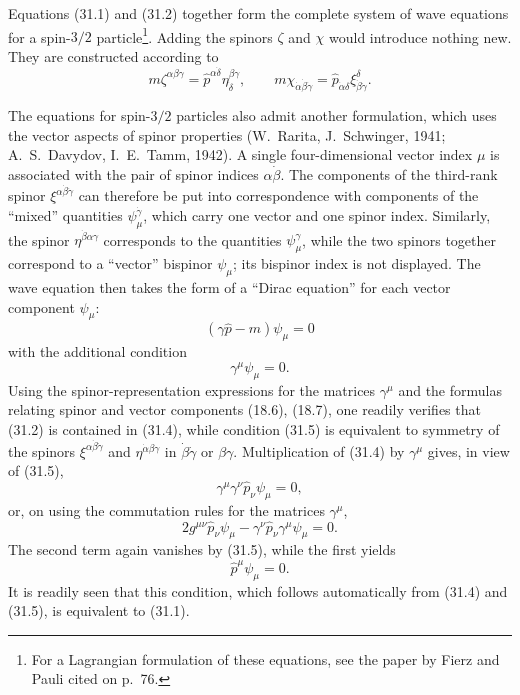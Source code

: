 Equations (31.1) and (31.2) together form the complete system of wave equations for a spin-$3/2$ particle\footnote{For a Lagrangian formulation of these equations, see the paper by Fierz and Pauli cited on p.~76.}. Adding the spinors $\zeta$ and $\chi$ would introduce nothing new. They are constructed according to
\[
m\zeta^{\alpha\beta\gamma}
=\widehat p^{\alpha\dot\delta}\eta^{\beta\gamma}_{\dot\delta},
\qquad
m\chi_{\dot\alpha\dot\beta\dot\gamma}
=\widehat p_{\dot\alpha\delta}\xi^\delta_{\dot\beta\dot\gamma}.
\]

The equations for spin-$3/2$ particles also admit another formulation, which uses the vector aspects of spinor properties (W.~Rarita, J.~Schwinger, 1941; A.~S.~Davydov, I.~E.~Tamm, 1942). A single four-dimensional vector index $\mu$ is associated with the pair of spinor indices $\alpha\dot\beta$. The components of the third-rank spinor $\xi^{\alpha\dot\beta\dot\gamma}$ can therefore be put into correspondence with components of the ``mixed'' quantities $\psi_\mu^{\dot\gamma}$, which carry one vector and one spinor index. Similarly, the spinor $\eta^{\dot\beta\alpha\gamma}$ corresponds to the quantities $\psi_\mu^\gamma$, while the two spinors together correspond to a ``vector'' bispinor $\psi_\mu$; its bispinor index is not displayed. The wave equation then takes the form of a ``Dirac equation'' for each vector component $\psi_\mu$:
\begin{equation}
(\gamma\widehat p-m)\psi_\mu=0
\tag{31.4}
\end{equation}
with the additional condition
\begin{equation}
\gamma^\mu\psi_\mu=0.
\tag{31.5}
\end{equation}
Using the spinor-representation expressions for the matrices $\gamma^\mu$ and the formulas relating spinor and vector components (18.6), (18.7), one readily verifies that (31.2) is contained in (31.4), while condition (31.5) is equivalent to symmetry of the spinors $\xi^{\alpha\dot\beta\dot\gamma}$ and $\eta^{\dot\alpha\beta\gamma}$ in $\dot\beta\dot\gamma$ or $\beta\gamma$. Multiplication of (31.4) by $\gamma^\mu$ gives, in view of (31.5),
\[
\gamma^\mu\gamma^\nu\widehat p_\nu\psi_\mu=0,
\]
or, on using the commutation rules for the matrices $\gamma^\mu$,
\begin{equation}
2g^{\mu\nu}\widehat p_\nu\psi_\mu
-\gamma^\nu\widehat p_\nu\gamma^\mu\psi_\mu=0.
\tag{31.6}
\end{equation}
The second term again vanishes by (31.5), while the first yields
\begin{equation}
\widehat p^\mu\psi_\mu=0.
\tag{31.7}
\end{equation}
It is readily seen that this condition, which follows automatically from (31.4) and (31.5), is equivalent to (31.1).

